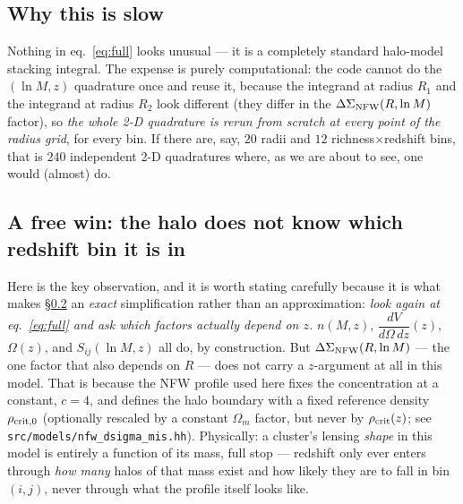 \documentclass[a4paper, 11pt]{article}
\newcommand{\lnM}{\ln M}
\newcommand{\dVdz}{\dfrac{dV}{d\Omega\,dz}}
\newcommand{\DSnfw}{\Delta\Sigma_{\rm NFW}}
\begin{document}
\subsection{Why this is slow}

Nothing in eq.~\eqref{eq:full} looks unusual --- it is a completely
standard halo-model stacking integral. The expense is purely
computational: the code cannot do the $(\lnM,z)$ quadrature once
and reuse it, because the integrand at radius $R_1$ and the
integrand at radius $R_2$ look different (they differ in the
$\DSnfw(R,\lnM)$ factor), so \emph{the whole 2-D quadrature is
rerun from scratch at every point of the radius grid}, for every
bin. If there are, say, $20$ radii and $12$ richness$\times$redshift
bins, that is $240$ independent 2-D quadratures where, as we are
about to see, one would (almost) do.

\subsection{A free win: the halo does not know which redshift bin it is in}
\label{sec:zwin}

Here is the key observation, and it is worth stating carefully
because it is what makes \S\ref{sec:zwin} an \emph{exact}
simplification rather than an approximation: \emph{look again at
eq.~\eqref{eq:full} and ask which factors actually depend on $z$.}
$n(M,z)$, $\dVdz(z)$, $\Omega(z)$, and $S_{ij}(\lnM,z)$ all do, by
construction. But $\DSnfw(R,\lnM)$ --- the one factor that also
depends on $R$ --- does not carry a $z$-argument at all in this
model. That is because the NFW profile used here fixes the
concentration at a constant, $c=4$, and defines the halo boundary
with a fixed reference density $\rho_{\rm crit,0}$ (optionally
rescaled by a constant $\Omega_m$ factor, but never by
$\rho_{\rm crit}(z)$; see \texttt{src/models/nfw\_dsigma\_mis.hh}).
Physically: a cluster's lensing \emph{shape} in this model is
entirely a function of its mass, full stop --- redshift only ever
enters through \emph{how many} halos of that mass exist and how
likely they are to fall in bin $(i,j)$, never through what the
profile itself looks like.
\end{document}
